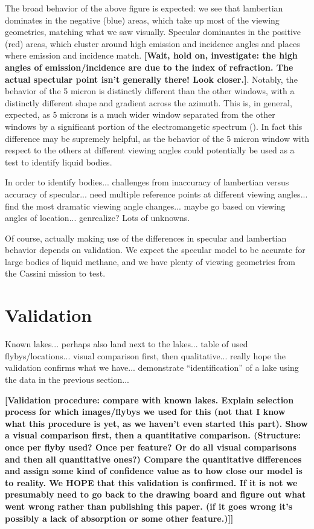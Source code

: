 \documentclass{article}
\begin{document}
The broad behavior of the above figure is expected: we see that lambertian dominates in the negative (blue) areas, which take up most of the viewing geometries, matching what we saw visually. Specular dominantes in the positive (red) areas, which cluster around high emission and incidence angles and places where emission and incidence match. \textbf{\color{red}[Wait, hold on, investigate: the high angles of emission/incidence are due to the index of refraction. The actual spectular point isn't generally there! Look closer.]\color{black}}. Notably, the behavior of the 5 micron is distinctly different than the other windows, with a distinctly different shape and gradient across the azimuth. This is, in general, expected, as 5 microns is a much wider window separated from the other windows by a significant portion of the electromangetic spectrum (). In fact this difference may be supremely helpful, as the behavior of the 5 micron window with respect to the others at different viewing angles could potentially be used as a test to identify liquid bodies. 

\color{Green}In order to identify bodies... challenges from inaccuracy of lambertian versus accuracy of specular... need multiple reference points at different viewing angles... find the most dramatic viewing angle changes... maybe go based on viewing angles of location... genrealize? Lots of unknowns. \color{black}

Of course, actually making use of the differences in specular and lambertian behavior depends on validation. We expect the specular model to be accurate for large bodies of liquid methane, and we have plenty of viewing geometries from the Cassini mission to test.

\section{Validation}
\color{Green}Known lakes... perhaps also land next to the lakes... table of used flybys/locations... visual comparison first, then qualitative... really hope the validation confirms what we have... demonstrate ``identification'' of a lake using the data in the previous section... \color{black}

\textbf{\color{red}[Validation procedure: compare with known lakes. Explain selection process for which images/flybys we used for this (not that I know what this procedure is yet, as we haven't even started this part). Show a visual comparison first, then a quantitative comparison. (Structure: once per flyby used? Once per feature? Or do all visual comparisons and then all quantitative ones?) Compare the quantitative differences and assign some kind of confidence value as to how close our model is to reality. We HOPE that this validation is confirmed. If it is not we presumably need to go back to the drawing board and figure out what went wrong rather than publishing this paper. (if it goes wrong it's possibly a lack of absorption or some other feature.)]]\color{black}}
\end{document}
